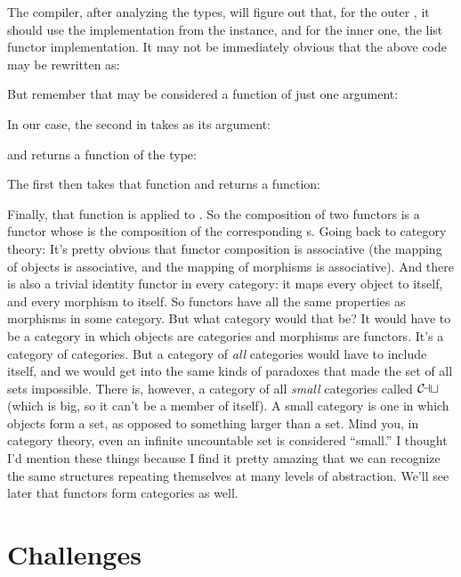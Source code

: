 The compiler, after analyzing the types, will figure out that, for the
outer , it should use the implementation from the
 instance, and for the inner one, the list functor
implementation. It may not be immediately obvious that the above code
may be rewritten as:

But remember that  may be considered a function of just one
argument:

In our case, the second  in  takes
as its argument:

and returns a function of the type:

The first  then takes that function and returns a function:

Finally, that function is applied to . So the composition of
two functors is a functor whose  is the composition of the
corresponding s. Going back to category theory: It's pretty
obvious that functor composition is associative (the mapping of objects
is associative, and the mapping of morphisms is associative). And there
is also a trivial identity functor in every category: it maps every
object to itself, and every morphism to itself. So functors have all the
same properties as morphisms in some category. But what category would
that be? It would have to be a category in which objects are categories
and morphisms are functors. It's a category of categories. But a
category of \emph{all} categories would have to include itself, and we
would get into the same kinds of paradoxes that made the set of all sets
impossible. There is, however, a category of all \emph{small} categories
called $\mathcal{C\mkern-3mu at}$ (which is big, so it can't be a member of itself). A
small category is one in which objects form a set, as opposed to
something larger than a set. Mind you, in category theory, even an
infinite uncountable set is considered ``small.'' I thought I'd mention
these things because I find it pretty amazing that we can recognize the
same structures repeating themselves at many levels of abstraction.
We'll see later that functors form categories as well.

\section{Challenges}

